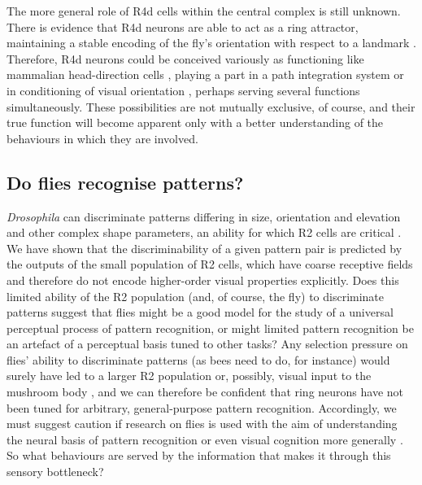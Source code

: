 The more general role of R4d cells within the central complex is still unknown.
There is evidence that R4d neurons are able to act as a ring attractor, maintaining a stable encoding of the fly's orientation with respect to a landmark \cite{Seelig2015,Cope2017}.
Therefore, R4d neurons could be conceived variously as functioning like mammalian head-direction cells \cite{Tomchik2008}, playing a part in a path integration system \cite{Neuser2008} or in conditioning of visual orientation \cite{Guo2015}, perhaps serving several functions simultaneously.
These possibilities are not mutually exclusive, of course, and their true function will become apparent only with a better understanding of the behaviours in which they are involved.

\subsection*{Do flies recognise patterns?}
\emph{Drosophila} can discriminate patterns differing in size, orientation and elevation and other complex shape parameters, an ability for which R2 cells are critical \cite{Ernst1999,Liu2006,Pan2009}.
We have shown that the discriminability of a given pattern pair is predicted by the outputs of the small population of R2 cells, which have coarse receptive fields and therefore do not encode higher-order visual properties explicitly.
Does this limited ability of the R2 population (and, of course, the fly) to discriminate patterns suggest that flies might be a good model for the study of a universal perceptual process of pattern recognition, or might limited pattern recognition be an artefact of a perceptual basis tuned to other tasks?
Any selection pressure on flies’ ability to discriminate patterns (as bees need to do, for instance) would surely have led to a larger R2 population or, possibly, visual input to the mushroom body \cite{Ehmer2002,Wolf1998}, and we can therefore be confident that ring neurons have not been tuned for arbitrary, general-purpose pattern recognition.
Accordingly, we must suggest caution if research on flies is used with the aim of understanding the neural basis of pattern recognition or even visual cognition more generally \cite{Menzel2001}.
So what behaviours are served by the information that makes it through this sensory bottleneck?

